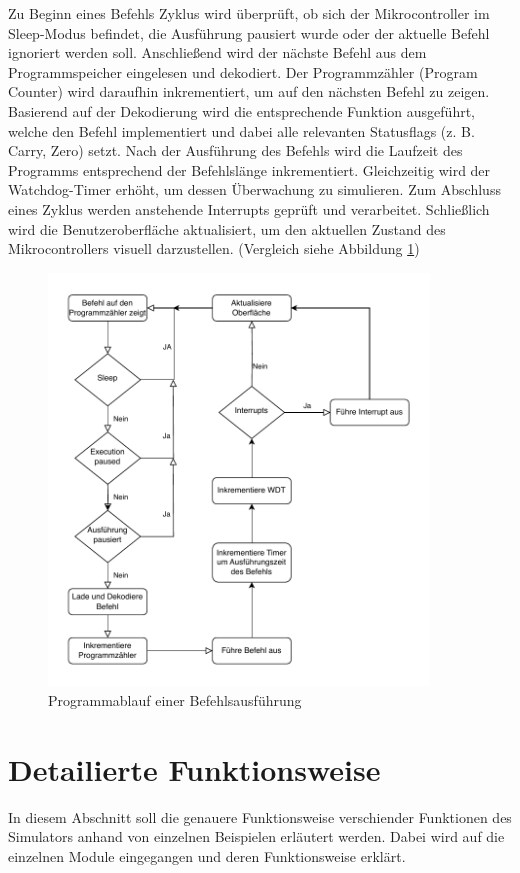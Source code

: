Zu Beginn eines Befehls Zyklus wird überprüft, ob sich der Mikrocontroller im Sleep-Modus befindet, die Ausführung pausiert wurde oder der aktuelle Befehl ignoriert werden soll. Anschließend wird der nächste Befehl aus dem Programmspeicher eingelesen und dekodiert. Der Programmzähler (Program Counter) wird daraufhin inkrementiert, um auf den nächsten Befehl zu zeigen. Basierend auf der Dekodierung wird die entsprechende Funktion ausgeführt, welche den Befehl implementiert und dabei alle relevanten Statusflags (z. B. Carry, Zero) setzt. Nach der Ausführung des Befehls wird die Laufzeit des Programms entsprechend der Befehlslänge inkrementiert. Gleichzeitig wird der Watchdog-Timer erhöht, um dessen Überwachung zu simulieren. Zum Abschluss eines Zyklus werden anstehende Interrupts geprüft und verarbeitet. Schließlich wird die Benutzeroberfläche aktualisiert, um den aktuellen Zustand des Mikrocontrollers visuell darzustellen. (Vergleich siehe Abbildung \ref{fig:execTask})

\begin{figure}[H]
    \centering
    \includegraphics[width=0.9\textwidth]{./img/excec_cycle.drawio.pdf}
    \caption{Programmablauf einer Befehlsausführung}
    \label{fig:execTask}
\end{figure}

\section{Detailierte Funktionsweise}
In diesem Abschnitt soll die genauere Funktionsweise verschiender Funktionen des Simulators anhand von einzelnen Beispielen erläutert werden. Dabei wird auf die einzelnen Module eingegangen und deren Funktionsweise erklärt.

